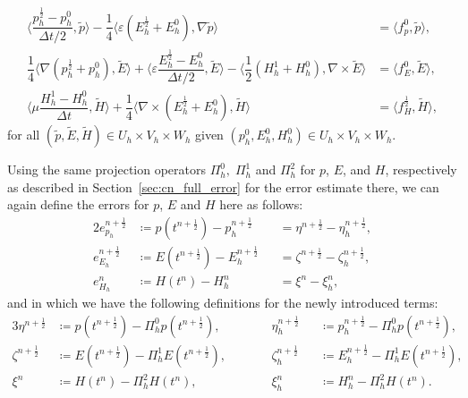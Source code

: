 \documentclass{amsart}
\theoremstyle{thmstyleone}%
\theoremstyle{thmstyletwo}%
\theoremstyle{thmstylethree}%
\newcommand{\aInnerproduct}[2]{\bigl\langle #1, #2 \bigr\rangle}
\begin{document}
\begin{subequations}
  \begin{align}
    \aInnerproduct{\dfrac{p_h^{\frac{1}{2}} - p_h^0}{\Delta t/2}}{\widetilde{p}} -\dfrac{1}{4} \aInnerproduct{ \varepsilon \left(  E_h^{\frac{1}{2}} + E_h^0 \right)}{\nabla \widetilde{p}} & = \aInnerproduct{ f_p^0}{\widetilde{p}}, \label{eqn:maxwell_p0_lf_full} \\
\dfrac{1}{4}  \aInnerproduct{\nabla \left( p_h^{\frac{1}{2}} + p_h^0 \right)}{\widetilde{E}} + \aInnerproduct{\varepsilon \dfrac{E_h^{\frac{1}{2}} - E_h^0}{\Delta t/2}}{\widetilde{E}} - \aInnerproduct{\dfrac{1}{2} \left( H_h^1 + H_h^0 \right)}{\nabla \times \widetilde{E}} &= \aInnerproduct{f_E^0}{\widetilde{E}}, \label{eqn:maxwell_E0_lf_full} \\
  \aInnerproduct{\mu \dfrac{H_h^1 - H_h^0}{\Delta t}}{\widetilde{H}} +  \dfrac{1}{4} \aInnerproduct{\nabla \times \left( E_h^{\frac{1}{2}} + E_h^0 \right)}{\widetilde{H}} &= \aInnerproduct{f_H^{\frac{1}{2}}}{\widetilde{H}}, \label{eqn:maxwell_H0_lf_full}
\end{align}
\end{subequations}
for all $(\widetilde{p}, \widetilde{E}, \widetilde{H}) \in U_h \times V_h \times W_h$ given $(p_h^0, E_h^0, H_h^0) \in U_h \times V_h \times W_h$. 

Using the same projection operators $\Pi_h^0, \; \Pi_h^1$ and  $\Pi_h^2$ for $p$, $E$, and $H$, respectively as described in Section~\ref{sec:cn_full_error} for the error estimate there, we can again define the errors for $p$, $E$ and $H$ here as follows:
\begin{alignat}{2}
  e_{p_h}^{n + \frac{1}{2}} &\coloneq p(t^{n + \frac{1}{2}}) - p_h^{n + \frac{1}{2}} &&= \eta^{n+\frac{1}{2}} - \eta_h^{n+\frac{1}{2}}, \label{eqn:p_fullerror_lf} \\
  e_{E_h}^{n + \frac{1}{2}} &\coloneq E(t^{n + \frac{1}{2}}) - E_h^{n + \frac{1}{2}} &&= \zeta^{n + \frac{1}{2}} - \zeta_h^{n + \frac{1}{2}}, \label{eqn:E_fullerror_lf} \\
  e_{H_h}^n &\coloneq H(t^n) - H_h^n &&= \xi^n - \xi_h^n, \label{eqn:H_fullerror_lf}
\end{alignat}
and in which we have the following definitions for the newly introduced terms:
\begin{alignat}{3}
  \eta^{n + \frac{1}{2}} &\coloneq p(t^{n + \frac{1}{2}}) - \Pi_h^0 p(t^{n + \frac{1}{2}}), &&\qquad \eta_h^{n + \frac{1}{2}} &&\coloneq p_h^{n + \frac{1}{2}}  - \Pi_h^0 p(t^{n + \frac{1}{2}}), \label{eqn:p_fullerror_sub_lf} \\
  \zeta^{n + \frac{1}{2}} &\coloneq E(t^{n + \frac{1}{2}}) - \Pi_h^1 E(t^{n + \frac{1}{2}}), &&\qquad \zeta_h^{n + \frac{1}{2}} &&\coloneq E_h^{n + \frac{1}{2}} - \Pi_h^1 E(t^{n + \frac{1}{2}}), \label{eqn:E_fullerror_sub_lf} \\
  \xi^n &\coloneq H(t^n) - \Pi_h^2 H(t^n), &&\qquad \xi_h^n &&\coloneq H_h^n - \Pi_h^2 H(t^n). \label{eqn:H_fullerror_sub_lf}
\end{alignat}
\end{document}

